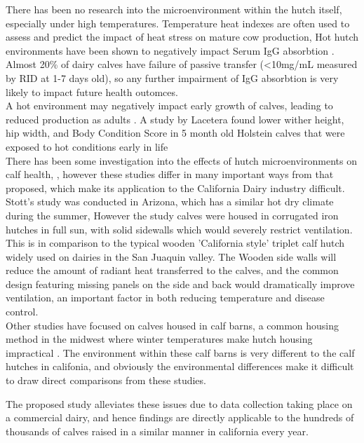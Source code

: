 \documentclass[12pt]{article}
\begin{document}
	There has been no research into the microenvironment within the hutch itself, especially under high temperatures. Temperature heat indexes are often used to assess and predict the impact of heat stress on mature cow production, 
	Hot hutch environments have been shown to negatively impact Serum IgG absorbtion \cite{Stott1976}. Almost 20\% of dairy calves have failure of passive transfer (<10mg/mL measured by RID at 1-7 days old)\cite{NAHMS2007}, so any further impairment of IgG absorbtion is very likely to impact future health outomces.\cite{Besser1994}\\
	A hot environment may negatively impact early growth of calves, leading to reduced production as adults \cite{Hoffman1997}. A study by Lacetera found lower wither height, hip width, and Body Condition Score in 5 month old Holstein calves that were exposed to hot conditions early in life \cite{lacetera1994} \\
	There has been some investigation into the effects of hutch microenvironments on calf health, \cite{Stott1976,Nordlund2008,Lago2006}, however these studies differ  in many important ways from that proposed, which make its application to the California Dairy industry difficult. 
	Stott's study was conducted in Arizona, which has a similar hot dry climate during the summer, However the study calves were housed in corrugated iron hutches in full sun, with solid sidewalls which would severely restrict ventilation\cite{Stott1976}. This is in comparison to the typical wooden 'California style' triplet calf hutch widely used on dairies in the San Juaquin valley. The Wooden side walls will reduce the amount of radiant heat transferred to the calves, and the common design featuring missing panels on the side and back would dramatically improve ventilation, an important factor in both reducing temperature and disease control\cite{Smith2002a}.\\
	Other studies have focused on calves housed in calf barns, a common housing method in the midwest where winter temperatures make hutch housing impractical \cite{Lago2006}. The environment within these calf barns is very different to the calf hutches in califonia, and obviously the environmental differences make it difficult to draw direct comparisons from these studies.


	The proposed study alleviates these issues due to data collection taking place on a commercial dairy, and hence findings are directly applicable to the hundreds of thousands of calves raised in a similar manner in california every year. %
\end{document}
